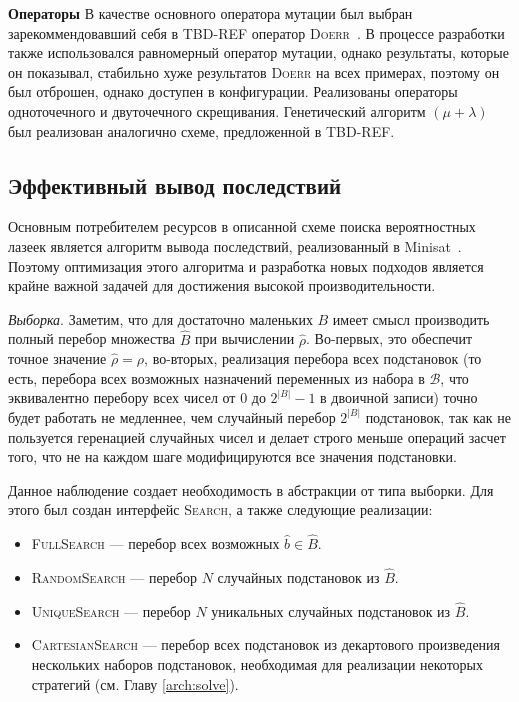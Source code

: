 \textbf{Операторы}
В качестве основного оператора мутации был выбран зарекоммендовавший себя в TBD-REF оператор 
\textsc{Doerr}~\cite{bib:doerr}. В процессе разработки также использовался равномерный оператор
мутации, однако результаты, которые он показывал, стабильно хуже результатов \textsc{Doerr} на
всех примерах, поэтому он был отброшен, однако доступен в конфигурации. Реализованы операторы
одноточечного и двуточечного скрещивания. Генетический алгоритм $(\mu + \lambda)$ был
реализован аналогично схеме, предложенной в TBD-REF.

\subsection{Эффективный вывод последствий}\label{arch:rbs:prop}

Основным потребителем ресурсов в описанной схеме поиска вероятностных лазеек является алгоритм
вывода последствий, реализованный в Minisat~\cite{bib:minisat}. Поэтому оптимизация этого алгоритма
и разработка новых подходов является крайне важной задачей для достижения высокой производительности.

\textit{Выборка}\label{arch:rbs:prop:sampling}. Заметим, что для достаточно маленьких $B$ имеет
смысл производить полный перебор множества $\hat{B}$ при вычислении $\hat{\rho}$. Во-первых,
это обеспечит точное значение $\hat{\rho} = \rho$, во-вторых, реализация перебора всех подстановок
(то есть, перебора всех возможных назначений переменных из набора в $\mathcal{B}$, что эквивалентно
перебору всех чисел от $0$ до $2^{|B|} - 1$ в двоичной записи) точно будет работать не медленнее,
чем случайный перебор $2^{|B|}$ подстановок, так как не пользуется геренацией случайных чисел и
делает строго меньше операций засчет того, что не на каждом шаге модифицируются все значения подстановки.

Данное наблюдение создает необходимость в абстракции от типа выборки. Для этого был создан интерфейс
\textsc{Search}, а также следующие реализации:
\begin{itemize}
    \item \textsc{FullSearch} --- перебор всех возможных $\hat{b} \in \hat{B}$.
    \item \textsc{RandomSearch} --- перебор $N$ случайных подстановок из $\hat{B}$.
    \item \textsc{UniqueSearch} --- перебор $N$ уникальных случайных подстановок из $\hat{B}$.
    \item \textsc{CartesianSearch} --- перебор всех подстановок из декартового произведения
        нескольких наборов подстановок, необходимая для реализации некоторых стратегий 
        (см. Главу \ref{arch:solve}).
\end{itemize}

